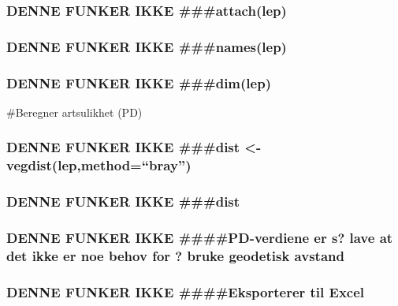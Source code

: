 \documentclass[]{article}
\begin{document}
\hypertarget{denne-funker-ikke-attachlep}{%
\subsubsection{DENNE FUNKER IKKE
\#\#\#attach(lep)}\label{denne-funker-ikke-attachlep}}

\hypertarget{denne-funker-ikke-nameslep}{%
\subsubsection{DENNE FUNKER IKKE
\#\#\#names(lep)}\label{denne-funker-ikke-nameslep}}

\hypertarget{denne-funker-ikke-dimlep}{%
\subsubsection{DENNE FUNKER IKKE
\#\#\#dim(lep)}\label{denne-funker-ikke-dimlep}}

\#Beregner artsulikhet (PD)

\hypertarget{denne-funker-ikke-dist---vegdistlepmethodbray}{%
\subsubsection{DENNE FUNKER IKKE \#\#\#dist \textless{}-
vegdist(lep,method=``bray'')}\label{denne-funker-ikke-dist---vegdistlepmethodbray}}

\hypertarget{denne-funker-ikke-dist}{%
\subsubsection{DENNE FUNKER IKKE
\#\#\#dist}\label{denne-funker-ikke-dist}}

\hypertarget{denne-funker-ikke-pd-verdiene-er-s-lave-at-det-ikke-er-noe-behov-for-bruke-geodetisk-avstand}{%
\subsubsection{DENNE FUNKER IKKE \#\#\#\#PD-verdiene er s? lave at det
ikke er noe behov for ? bruke geodetisk
avstand}\label{denne-funker-ikke-pd-verdiene-er-s-lave-at-det-ikke-er-noe-behov-for-bruke-geodetisk-avstand}}

\hypertarget{denne-funker-ikke-eksporterer-til-excel}{%
\subsubsection{DENNE FUNKER IKKE \#\#\#\#Eksporterer til
Excel}\label{denne-funker-ikke-eksporterer-til-excel}}
\end{document}
